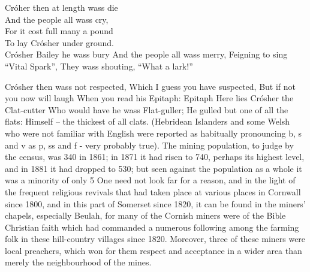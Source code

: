 \documentclass[10pt,a4paper]{article}
\begin{document}
Cróher then at length wass die \\
And the people all wass cry, \\
For it cost full many a pound \\
To lay Crósher under ground. \\

Crósher Bailey he wass bury
And the people all wass merry,
Feigning to sing “Vital Spark”, 
They wass shouting, “What a lark!”

Crósher then wass not respected,
Which I guess you have suspected,
But if not you now will laugh
When you read his Epitaph:	   	      	
Epitaph
Here lies Crósher the Clat-cutter
Who would have he wass Flat-guller;
He gulled but one of all the flats:
Himself --  the thickest of all clats.	
             (Hebridean Islanders and some Welsh who were not familiar with English were reported as habitually pronouncing  b, s and v as p, ss  and f  - very probably true).	  	
  The mining population, to judge by the census, was 340 in 1861; in 1871 it had risen to 740, perhaps its highest level, and in 1881 it had dropped to 530; but seen against the population as a whole it was a minority of only 5%
     One need not look far for a reason, and in the light of the frequent religious revivals that had taken place at various places in Cornwall since 1800, and in this part of Somerset since 1820, it can be found in the miners’ chapels, especially Beulah, for many of the Cornish miners were of the Bible Christian faith which had commanded a numerous following among the farming folk in these hill-country villages since 1820. Moreover, three of these miners were local preachers, which won for them respect and acceptance in a wider area than merely the neighbourhood of the mines.  
\end{document}
